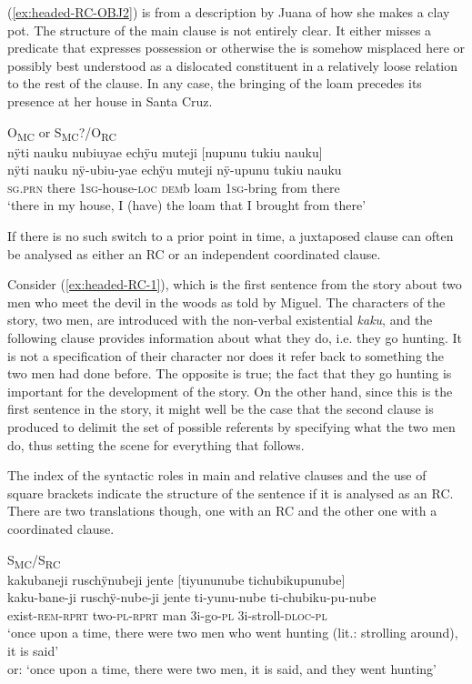 (\ref{ex:headed-RC-OBJ2}) is from a description by Juana of how she makes a clay pot. The structure of the main clause is not entirely clear. It either misses a predicate that expresses possession or otherwise the  is somehow misplaced here or possibly best understood as a dislocated constituent in a relatively loose relation to the rest of the clause. In any case, the bringing of the loam precedes its presence at her house in Santa Cruz.

\ea\label{ex:headed-RC-OBJ2}
\begingl
\glpreamble \textup{O\textsubscript{MC} or S\textsubscript{MC}?/O\textsubscript{RC}}\\nÿti nauku nubiuyae echÿu muteji \textup{[}nupunu tukiu nauku\textup{]}\\
\gla nÿti nauku nÿ-ubiu-yae echÿu muteji nÿ-upunu tukiu nauku\\
\textsc{sg.prn} there 1\textsc{sg}-house-\textsc{loc} \textsc{dem}b loam 1\textsc{sg}-bring from there\\
\glft ‘there in my house, I (have) the loam that I brought from there’
\endgl
\trailingcitation{[jxx-d110923l-1.01]}
\xe

If there is no such switch to a prior point in time, a juxtaposed clause can often be analysed as either an RC or an independent coordinated clause.

Consider (\ref{ex:headed-RC-1}), which is the first sentence from the story about two men who meet the devil in the woods as told by Miguel. The characters of the story, two men, are introduced with the non-verbal existential  \textit{kaku}, and the following clause provides information about what they do, i.e. they go hunting. It is not a specification of their character nor does it refer back to something the two men had done before. The opposite is true; the fact that they go hunting is important for the development of the story. On the other hand, since this is the first sentence in the story, it might well be the case that the second clause is produced to delimit the set of possible referents by specifying what the two men do, thus setting the scene for everything that follows. 

The index of the syntactic roles in main and relative clauses and the use of square brackets indicate the structure of the sentence if it is analysed as an RC. There are two translations though, one with an RC and the other one with a coordinated clause.

\ea\label{ex:headed-RC-1}
\begingl
\glpreamble \textup{S\textsubscript{MC}/S\textsubscript{RC}}\\kakubaneji ruschÿnubeji jente \textup{[}tiyununube tichubikupunube\textup{]}\\
\gla kaku-bane-ji ruschÿ-nube-ji jente ti-yunu-nube ti-chubiku-pu-nube\\
\glb exist-\textsc{rem}-\textsc{rprt} two-\textsc{pl}-\textsc{rprt} man 3i-go-\textsc{pl} 3i-stroll-\textsc{dloc}-\textsc{pl}\\
\glft ‘once upon a time, there were two men who went hunting (lit.: strolling around), it is said’\\or: ‘once upon a time, there were two men, it is said, and they went hunting’
\endgl
\trailingcitation{[mxx-n101017s-1.014]}
\xe

